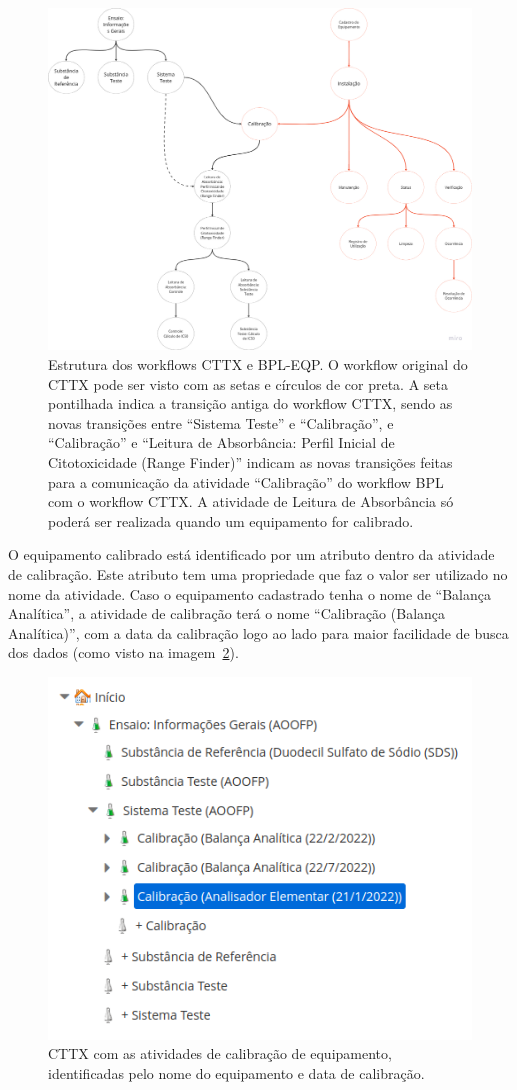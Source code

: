 \begin{figure}
    \centering
    \includegraphics[width=1\textwidth]{imgs/CTTX-EQP/estrutura_cttx_eqp.png}
    \caption{Estrutura dos workflows CTTX e BPL-EQP. O workflow original do CTTX pode ser visto com as setas e círculos de cor preta. A seta pontilhada indica a transição antiga do workflow CTTX, sendo as novas transições entre ``Sistema Teste'' e ``Calibração'', e ``Calibração'' e ``Leitura de Absorbância: Perfil Inicial de Citotoxicidade (Range Finder)'' indicam as novas transições feitas para a comunicação da atividade ``Calibração'' do workflow BPL com o workflow CTTX. A atividade de Leitura de Absorbância só poderá ser realizada quando um equipamento for calibrado.}
    \label{fig:cttx_eqp_structure}
\end{figure}

O equipamento calibrado está identificado por um atributo dentro da atividade de calibração. Este atributo tem uma propriedade que faz o valor ser utilizado no nome da atividade. Caso o equipamento cadastrado tenha o nome de ``Balança Analítica'', a atividade de calibração terá o nome ``Calibração (Balança Analítica)'', com a data da calibração logo ao lado para maior facilidade de busca dos dados (como visto na imagem~\ref{fig:cttx_eqp_calibration}).

\begin{figure}
    \centering
    \includegraphics[width=.5\textwidth]{imgs/CTTX-EQP/calibration_tree.png}
    \caption{CTTX com as atividades de calibração de equipamento, identificadas pelo nome do equipamento e data de calibração.}
    \label{fig:cttx_eqp_calibration}
\end{figure}
